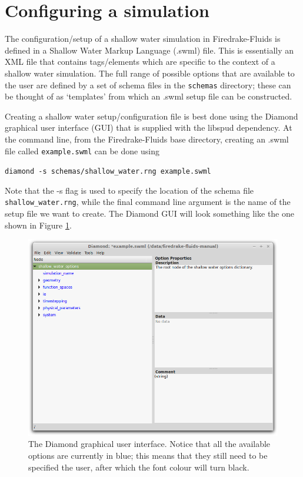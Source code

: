 \documentclass[a4paper,11pt]{report}
\begin{document}
\section{Configuring a simulation}
The configuration/setup of a shallow water simulation in Firedrake-Fluids is defined in a Shallow Water Markup Language (.swml) file. This is essentially an XML file that contains tags/elements which are specific to the context of a shallow water simulation. The full range of possible options that are available to the user are defined by a set of schema files in the \texttt{schemas} directory; these can be thought of as `templates' from which an .swml setup file can be constructed.

Creating a shallow water setup/configuration file is best done using the Diamond graphical user interface (GUI) \citep{Ham_etal_2009} that is supplied with the libspud dependency. At the command line, from the Firedrake-Fluids base directory, creating an .swml file called \texttt{example.swml} can be done using

\texttt{diamond -s schemas/shallow\_water.rng example.swml}

Note that the -s flag is used to specify the location of the schema file \texttt{shallow\_water.rng}, while the final command line argument is the name of the setup file we want to create. The Diamond GUI will look something like the one shown in Figure \ref{fig:diamond}.

\begin{figure}[!ht]
   \centering
   \includegraphics[width=1\columnwidth]{images/diamond.png}
   \caption{The Diamond \citep{Ham_etal_2009} graphical user interface. Notice that all the available options are currently in blue; this means that they still need to be specified the user, after which the font colour will turn black.}
   \label{fig:diamond}
\end{figure}
\end{document}
